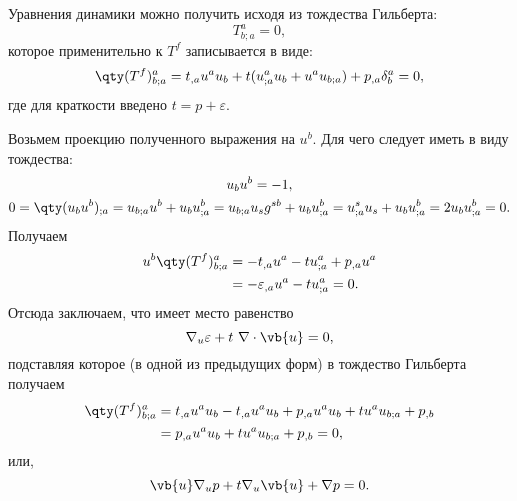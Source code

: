 \documentclass[\docroot/reports/draft/report.tex]{subfiles}
\begin{document}
    Уравнения динамики можно получить исходя из тождества Гильберта:
    \begin{equation}
        T^a_{b;a} = 0 ,
    \end{equation}
    которое применительно к $T^f$ записывается в виде:
    \begin{equation*}
        \qty(T^f)^a_{b;a} = t_{,a} u^a u_b + t (u^a_{;a} u_b + u^a u_{b;a}) + p_{,a} \delta^a_b = 0,
    \end{equation*}
    где для краткости введено $t = p + \varepsilon$.

    Возьмем проекцию полученного выражения на $u^b$. Для чего следует иметь в виду тождества:
    \begin{gather*}
        u_b u^b = -1 , \\
        0 = \qty(u_b u^b)_{;a} = u_{b;a} u^b + u_b u^b_{;a}
          = u_{b;a} u_s g^{sb} + u_b u^b_{;a}
          = u^s_{;a} u_s + u_b u^b_{;a}
          = 2 u_b u^b_{;a}
          = 0 .
    \end{gather*}
    Получаем
    \begin{equation*}\begin{aligned}
        u^b \qty(T^f)^a_{b;a} &= - t_{,a} u^a - t u^a_{;a} + p_{,a} u^a \\
                              &= - \varepsilon_{,a} u^a - t u^a_{;a} = 0 .
    \end{aligned}\end{equation*}
    Отсюда заключаем, что имеет место равенство
    \begin{equation}
        \nabla_u \varepsilon + t\ \nabla \cdot \vb{u} = 0 ,
    \end{equation}
    подставляя которое (в одной из предыдущих форм) в тождество Гильберта получаем
    \begin{equation*}\begin{aligned}
        \qty(T^f)^a_{b;a} &= t_{,a} u^a u_b - t_{,a} u^a u_b + p_{,a} u^a u_b + t u^a u_{b;a} + p_{,b} \\
                          &= p_{,a} u^a u_b + t u^a u_{b;a} + p_{,b} = 0 ,
    \end{aligned}\end{equation*}
    или,
    \begin{equation}
        \vb{u} \nabla_u p + t \nabla_u \vb{u} + \nabla p = 0 .
    \end{equation}

    \vspace{1cm}
\end{document}
